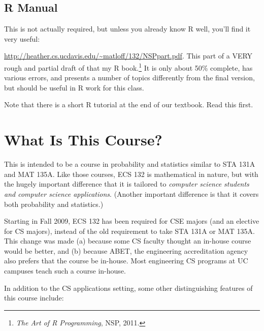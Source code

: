 \subsection{R Manual}

This is not actually required, but unless you already know R well,
you'll find it very useful:

\url{http://heather.cs.ucdavis.edu/~matloff/132/NSPpart.pdf}.  This part
of a VERY rough and partial draft of that my R book.\footnote{{\it The
Art of R Programming}, NSP, 2011.} It is only about 50\% complete, has
various errors, and presents a number of topics differently from the
final version, but should be useful in R work for this class.  

Note that there is a short R tutorial at the end of our textbook.  Read
this first.

\section{What Is This Course?}

This is intended to be a course in probability and statistics similar to
STA 131A and MAT 135A.  Like those courses, ECS 132 is mathematical in
nature,  but with the hugely important difference that it is tailored to
{\it computer science students and computer science applications}.  (Another
important difference is that it covers both probability and statistics.)

Starting in Fall 2009, ECS 132 has been required for CSE majors (and an
elective for CS majors), instead of the old requirement to take STA 131A
or MAT 135A.  This change was made (a) because some CS faculty thought
an in-house course would be better, and (b) because ABET, the
engineering accreditation agency also prefers that the course be
in-house.  Most engineering CS programs at UC campuses teach such
a course in-house.

In addition to the CS applications setting, some other distinguishing
features of this course include:

